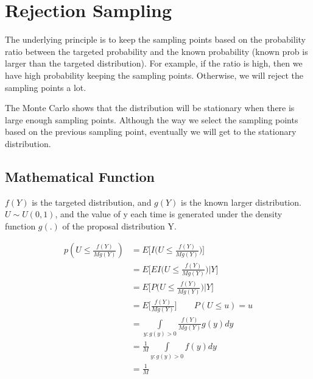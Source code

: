 \section{Rejection Sampling}

The underlying principle is to keep the sampling points based on the probability ratio between the targeted probability and the known probability (known prob is larger than the targeted distribution).
For example, if the ratio is high, then we have high probability keeping the sampling points. Otherwise, we will reject the sampling points a lot.

The Monte Carlo shows that the distribution will be stationary when there is large enough sampling points. Although the way we select the sampling points based on the previous sampling point, eventually we will get to the stationary distribution.

\subsection{Mathematical Function}

$f(Y)$ is the targeted distribution, and $g(Y)$ is the known larger distribution. $U \sim U(0,1)$, and the value of y each time is generated under the density function $g(.)$ of the proposal distribution Y.

\begin{align*}
p( U \leq \frac{f(Y)}{M g(Y)}) &= E \Big[ I \Big(U \leq \frac{f(Y)}{Mg(Y)} \Big) \Big] \\
&= E \Big[ E I \Big(U \leq \frac{f(Y)}{Mg(Y)} \Big) | Y \Big] \\
&= E \Big[ P  \Big(U \leq \frac{f(Y)}{Mg(Y)}  \Big) | Y \Big] \\
&= E \Big[ \frac{f(Y)}{Mg(Y)} \Big ] \qquad {P(U \leq u) = u} \\
&= \underset{y: g(y) >0}{\int} \frac{f(Y)}{M g(Y)} g(y) dy \\
&= \frac{1}{M} \underset{y: g(y) >0}{\int} f(y) dy \\
&= \frac{1}{M}
\end{align*}

